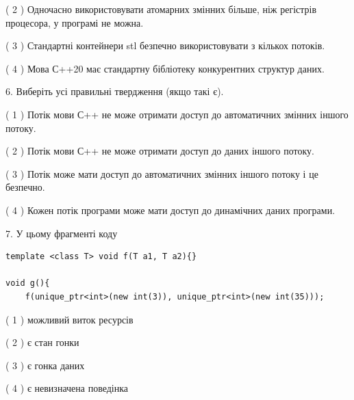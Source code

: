\documentclass[12pt, ukrainian]{article}
\begin{document}
\begin {large}
{( 2 ) Одночасно використовувати атомарних змінних більше, ніж регістрів процесора, у програмі не можна.%

( 3 ) Стандартні контейнери stl безпечно використовувати з кількох потоків.%

( 4 ) Мова С++20 має стандартну бібліотеку конкурентних структур даних.%
\newpage



\vspace{5mm}
6. Виберіть усі правильні твердження (якщо такі є).\par
\vspace{2mm}

( 1 ) Потік мови С++ не може отримати доступ до автоматичних змінних іншого потоку.%

( 2 ) Потік мови С++ не може отримати доступ до даних іншого потоку.%

( 3 ) Потік може мати доступ до автоматичних змінних іншого потоку і це безпечно.%

( 4 ) Кожен потік програми може мати доступ до динамічних даних програми.%


\vspace{5mm}
7. У цьому фрагменті коду
\begin{verbatim}
template <class T> void f(T a1, T a2){}

void g(){
    f(unique_ptr<int>(new int(3)), unique_ptr<int>(new int(35)));
\end{verbatim}

( 1 ) можливий виток ресурсів%

( 2 ) є стан гонки%

( 3 ) є гонка даних%

( 4 ) є невизначена поведінка%
}
\end {large}
\end{document}
